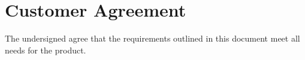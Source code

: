 \documentclass[12pt,letterpaper]{article}
\begin{document}
\clearpage
\section{Customer Agreement}


The undersigned agree that the requirements outlined in this document meet all needs for the product.


\end{document}

